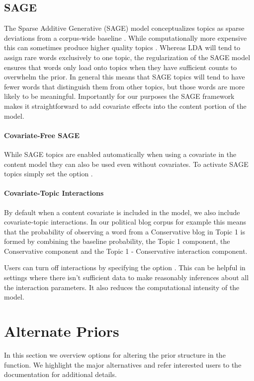 \documentclass[nojss]{jss}
\begin{document}
\subsection{SAGE}
The Sparse Additive Generative (SAGE) model conceptualizes topics as sparse deviations from a corpus-wide baseline \citep{eisenstein2011sparse}.  While computationally more expensive this can sometimes produce higher quality topics .  Whereas LDA will tend to assign rare words exclusively to one topic, the regularization of the SAGE model ensures that words only load onto topics when they have sufficient counts to overwhelm the prior.  In general this means that SAGE topics will tend to have fewer words that distinguish them from other topics, but those words are more likely to be meaningful.  Importantly for our purposes the SAGE framework makes it straightforward to add covariate effects into the content portion of the model.

\paragraph{Covariate-Free SAGE}
While SAGE topics are enabled automatically when using a covariate in the content model they can also be used even without covariates.  To activate SAGE topics simply set the option .

\paragraph{Covariate-Topic Interactions}
By default when a content covariate is included in the model, we also include covariate-topic interactions.  In our political blog corpus for example this means that the probability of observing a word from a Conservative blog in Topic 1 is formed by combining the baseline probability, the Topic 1 component, the Conservative component and the Topic 1 - Conservative interaction component.

Users can turn off interactions by specifying the option .  This can be helpful in settings where there isn't sufficient data to make reasonably inferences about all the interaction parameters.  It also reduces the computational intensity of the model.

\section{Alternate Priors}
In this section we overview options for altering the prior structure in the   function.  We highlight the major alternatives and refer interested users to the documentation for additional details.
\end{document}
